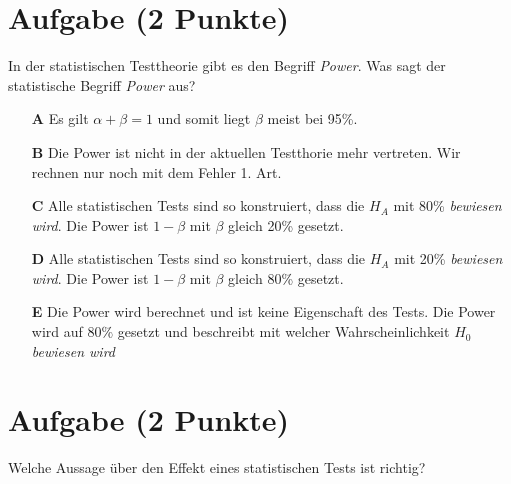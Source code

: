 \documentclass[a4paper, 9pt]{scrartcl}\usepackage[]{graphicx}\usepackage[]{xcolor}
\begin{document}
\section{Aufgabe \hfill (2 Punkte)}



In der statistischen Testtheorie gibt es den Begriff \textit{Power}. Was sagt der statistische Begriff \textit{Power} aus?



\begin{enumerate}
\item [\textbf{A} \msquare] Es gilt $\alpha + \beta = 1$ und somit liegt $\beta$ meist bei 95\%.
\item [\textbf{B} \msquare] Die Power ist nicht in der aktuellen Testthorie mehr vertreten. Wir rechnen nur noch mit dem Fehler 1. Art.
\item [\textbf{C} \msquare] Alle statistischen Tests sind so konstruiert, dass die $H_A$ mit 80\% \textit{bewiesen wird}. Die Power ist $1-\beta$ mit $\beta$ gleich 20\% gesetzt.
\item [\textbf{D} \msquare] Alle statistischen Tests sind so konstruiert, dass die $H_A$ mit 20\% \textit{bewiesen wird}. Die Power ist $1-\beta$ mit $\beta$ gleich 80\% gesetzt.
\item [\textbf{E} \msquare] Die Power wird berechnet und ist keine Eigenschaft des Tests. Die Power wird auf $80\%$ gesetzt und beschreibt mit welcher Wahrscheinlichkeit $H_0$ \textit{bewiesen wird}
\end{enumerate}

\section{Aufgabe \hfill (2 Punkte)}



Welche Aussage über den Effekt eines statistischen Tests ist richtig?
\end{document}
